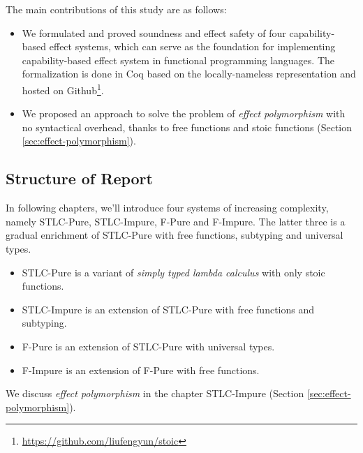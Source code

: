 The main contributions of this study are as follows:

\begin{itemize}
\item We formulated and proved soundness and effect safety of four
  capability-based effect systems, which can serve as the foundation
  for implementing capability-based effect system in functional
  programming languages. The formalization is done in Coq based on the
  locally-nameless representation\cite{chargueraud-11-ln} and hosted
  on Github\footnote{\url{https://github.com/liufengyun/stoic}}.
\item We proposed an approach to solve the problem of \emph{effect
    polymorphism} with no syntactical overhead, thanks to free
  functions and stoic functions (Section
  \ref{sec:effect-polymorphism}).
\end{itemize}

\subsection{Structure of Report}

In following chapters, we'll introduce four systems of increasing
complexity, namely STLC-Pure, STLC-Impure, F-Pure and F-Impure. The
latter three is a gradual enrichment of STLC-Pure with free functions,
subtyping and universal types.

\begin{itemize}
\item STLC-Pure is a variant of \emph{simply typed lambda calculus}
  with only stoic functions.
\item STLC-Impure is an extension of STLC-Pure with free functions and subtyping.
\item F-Pure is an extension of STLC-Pure with universal types.
\item F-Impure is an extension of F-Pure with free functions.
\end{itemize}

We discuss \emph{effect polymorphism} in the chapter STLC-Impure
(Section \ref{sec:effect-polymorphism}).
